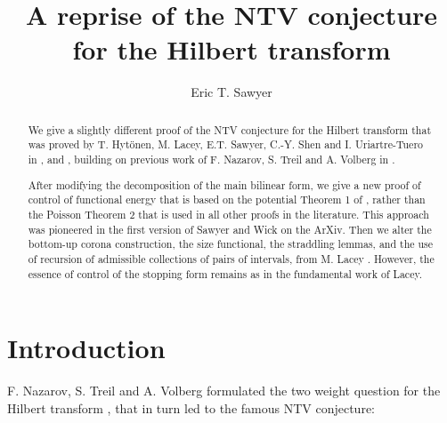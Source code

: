 \documentclass{amsart}%
\theoremstyle{plain}
\numberwithin{equation}{section}
\begin{document}
\title{A reprise of the NTV conjecture for the Hilbert transform}
\author{Eric T. Sawyer}
\address{McMaster University}

\begin{abstract}
We give a slightly different proof of the NTV conjecture for the Hilbert
transform that was proved by T. Hyt\"{o}nen, M. Lacey, E.T. Sawyer, C.-Y. Shen
and I. Uriartre-Tuero in \cite{LaSaShUr3}, \cite{Lac} and \cite{Hyt2},
building on previous work of F. Nazarov, S. Treil and A. Volberg in
\cite{NTV3}.

After modifying the decomposition of the main bilinear form, we give a new
proof of control of functional energy that is based on the potential Theorem 1
of \cite{Saw3}, rather than the Poisson Theorem 2 that is used in all other
proofs in the literature. This approach was pioneered in the first version of
Sawyer and Wick \cite{SaWi} on the ArXiv.  Then we alter the bottom-up corona
construction, the size functional, the straddling lemmas, and the use of
recursion of admissible collections of pairs of intervals, from M. Lacey
\cite{Lac}. However, the essence of control of the stopping form remains as in
the fundamental work of Lacey.

\end{abstract}
\maketitle
\tableofcontents


\section{Introduction}

F. Nazarov, S. Treil and A. Volberg formulated the two weight question for the
Hilbert transform \cite{Vol}, that in turn led to the famous NTV conjecture:
\end{document}
